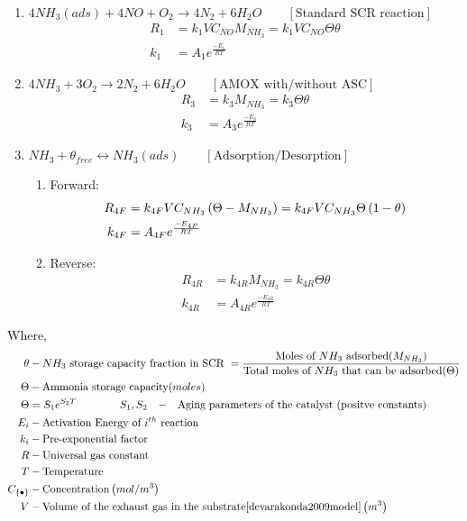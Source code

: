 \begin{enumerate}
\item $4 NH_3 (ads) + 4 NO + O_2 \longrightarrow 4 N_2 + 6 H_2O
\qquad [\text{Standard SCR reaction}] $
\begin{align*}
    R_1 &= k_1 V C_{NO} M_{NH_3} = k_1V C_{NO} \Theta \theta\\
    k_1 &= A_1 e^{\frac{-E_1}{RT}}
\end{align*}

\item $4 NH_3 + 3 O_2 \longrightarrow 2 N_2 + 6 H_2O \qquad [\text{AMOX with/without ASC}]$
\begin{align*}
    R_3 &= k_3 M_{NH_3} = k_3 \Theta \theta\\
    k_3 &= A_3 e^{\frac{-E_3}{RT}}
\end{align*}

\item $NH_3 + \theta_{free} \longleftrightarrow NH_3(ads) \qquad [\text{Adsorption/Desorption}]$
\begin{enumerate}
\item Forward:
\begin{align*}
    R_{4F} &= k_{4F} V C_{NH_3} \left( \Theta - M_{NH_3} \right)
            = k_{4F} V C_{NH_3} \Theta \left( 1 - \theta \right)\\
    k_{4F} &= A_{4F} e^{\frac{-E_{4F}}{RT}}
\end{align*}

\item Reverse:
\begin{align*}
    R_{4R} &= k_{4R} M_{NH_3}
            = k_{4R} \Theta \theta \\
    k_{4R} &= A_{4R} e^{\frac{-E_{4R}}{RT}}
\end{align*}
\end{enumerate}
\end{enumerate}

Where,
\begin{align*}
    \theta &- NH_3 \text{ storage capacity fraction in SCR } = \frac{\text{Moles of $NH_3$ adsorbed} (M_{NH_3})}{\text{Total moles of $NH_3$ that can be adsorbed} (\Theta)}\\
    \Theta &- \text{Ammonia storage capacity} (moles)\\
    \Theta &= S_1 e^{S_2 T} \qquad \qquad \begin{matrix*}[l]
                S_1, S_2 &-& \text{Aging parameters of the catalyst (positve constants)}
            \end{matrix*}\\
    E_i &- \text{Activation Energy of $i^{th}$ reaction}\\
    k_i &- \text{Pre-exponential factor}\\
    R &- \text{Universal gas constant}\\
    T &- \text{Temperature}\\
    C_{\{\bullet\}} &- \text{Concentration} \lr{mol/m^3}\\
    V &- \text{Volume of the exhaust gas in the substrate\cite{devarakonda2009model}} \lr{m^3}\\
\end{align*}


